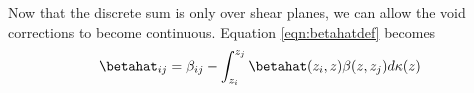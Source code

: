 Now that the discrete sum is only over shear planes, we can allow the void corrections to become continuous. Equation \ref{eqn:betahatdef} becomes
\begin{equation}
\betahat_{i j} = \beta_{ i j} - \int_{z_i}^{z_j} \betahat(z_i, z) \beta(z, z_j) d\kappa(z)
\end{equation}
  